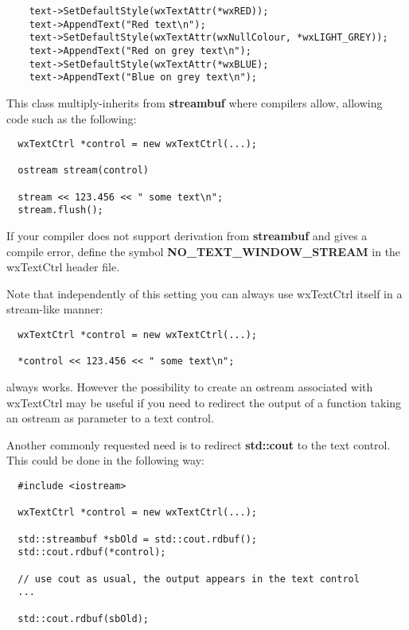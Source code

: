 {\small%
\begin{verbatim}
    text->SetDefaultStyle(wxTextAttr(*wxRED));
    text->AppendText("Red text\n");
    text->SetDefaultStyle(wxTextAttr(wxNullColour, *wxLIGHT_GREY));
    text->AppendText("Red on grey text\n");
    text->SetDefaultStyle(wxTextAttr(*wxBLUE);
    text->AppendText("Blue on grey text\n");
\end{verbatim}
}%


This class multiply-inherits from {\bf streambuf} where compilers allow,
allowing code such as the following:

{\small%
\begin{verbatim}
  wxTextCtrl *control = new wxTextCtrl(...);

  ostream stream(control)

  stream << 123.456 << " some text\n";
  stream.flush();
\end{verbatim}
}%

If your compiler does not support derivation from {\bf streambuf} and gives a
compile error, define the symbol {\bf NO\_TEXT\_WINDOW\_STREAM} in the
wxTextCtrl header file.

Note that independently of this setting you can always use wxTextCtrl itself
in a stream-like manner:

{\small%
\begin{verbatim}
  wxTextCtrl *control = new wxTextCtrl(...);

  *control << 123.456 << " some text\n";
\end{verbatim}
}%

always works. However the possibility to create an ostream associated with
wxTextCtrl may be useful if you need to redirect the output of a function
taking an ostream as parameter to a text control.

Another commonly requested need is to redirect {\bf std::cout} to the text
control. This could be done in the following way:

{\small%
\begin{verbatim}
  #include <iostream>

  wxTextCtrl *control = new wxTextCtrl(...);

  std::streambuf *sbOld = std::cout.rdbuf();
  std::cout.rdbuf(*control);

  // use cout as usual, the output appears in the text control
  ...

  std::cout.rdbuf(sbOld);
\end{verbatim}
}%

